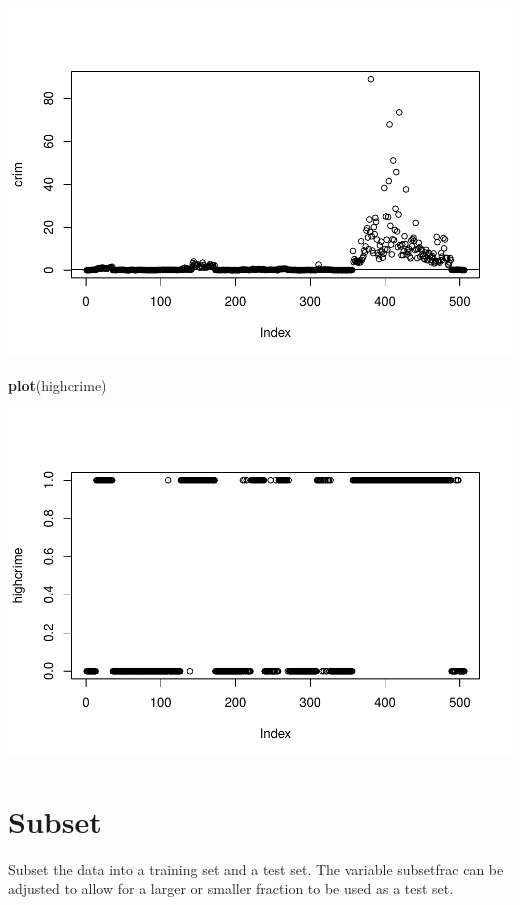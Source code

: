 \documentclass[
]{article}
\newenvironment{Shaded}{\begin{snugshade}}{\end{snugshade}}
\newcommand{\KeywordTok}[1]{\textcolor[rgb]{0.13,0.29,0.53}{\textbf{#1}}}
\newcommand{\NormalTok}[1]{#1}
\begin{document}
\includegraphics{4-13_files/figure-latex/unnamed-chunk-3-1.pdf}

\begin{Shaded}
\begin{Highlighting}[]
\KeywordTok{plot}\NormalTok{(highcrime)}
\end{Highlighting}
\end{Shaded}

\includegraphics{4-13_files/figure-latex/unnamed-chunk-3-2.pdf}

\hypertarget{subset}{%
\section{Subset}\label{subset}}

Subset the data into a training set and a test set. The variable
subsetfrac can be adjusted to allow for a larger or smaller fraction to
be used as a test set.
\end{document}
